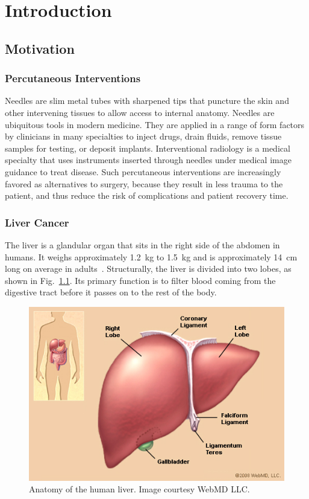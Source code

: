 \chapter{Introduction}

\section{Motivation}
\subsection{Percutaneous Interventions}
Needles are slim metal tubes with sharpened tips that puncture the skin and other intervening tissues to allow access to internal anatomy. Needles are ubiquitous tools in modern medicine. They are applied in a range of form factors by clinicians in many specialties to inject drugs, drain fluids, remove tissue samples for testing, or deposit implants. Interventional radiology is a medical specialty that uses instruments inserted through needles under medical image guidance to treat disease. Such percutaneous interventions are increasingly favored as alternatives to surgery, because they result in less trauma to the patient, and thus reduce the risk of complications and patient recovery time. 

\subsection{Liver Cancer}
The liver is a glandular organ that sits in the right side of the abdomen in humans. It weighs approximately 1.2~kg to 1.5~kg and is approximately 14~cm long on average in adults~\cite{Wolf1990,Kratzer2003}. Structurally, the liver is divided into two lobes, as shown in Fig.~\ref{fig:Ch1LiverAnatomy}. Its primary function is to filter blood coming from the digestive tract before it passes on to the rest of the body. 

\begin{figure}[!h]
\centering
\includegraphics[width = 0.75\columnwidth]{./Images/Chapter1/liverIllustration.jpg}%
\caption{Anatomy of the human liver. Image courtesy WebMD LLC.}
\label{fig:Ch1LiverAnatomy}
\end{figure}    

